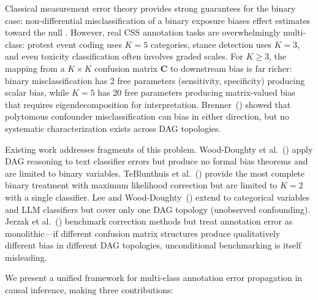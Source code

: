 \documentclass[11pt,letterpaper]{article}
\begin{document}
Classical measurement error theory provides strong guarantees for the binary case: non-differential misclassification of a binary exposure biases effect estimates toward the null \cite{bross1954}.
However, real CSS annotation tasks are overwhelmingly multi-class: protest event coding uses $K=5$ categories, stance detection uses $K=3$, and even toxicity classification often involves graded scales.
For $K \geq 3$, the mapping from a $K \times K$ confusion matrix $\mathbf{C}$ to downstream bias is far richer: binary misclassification has 2 free parameters (sensitivity, specificity) producing scalar bias, while $K=5$ has 20 free parameters producing matrix-valued bias that requires eigendecomposition for interpretation.
Brenner~(\citeyear{brenner1993}) showed that polytomous confounder misclassification can bias in either direction, but no systematic characterization exists across DAG topologies.

Existing work addresses fragments of this problem.
Wood-Doughty et al.~(\citeyear{wooddoughty2018}) apply DAG reasoning to text classifier errors but produce no formal bias theorems and are limited to binary variables.
TeBlunthuis et al.~(\citeyear{teblunthuis2024}) provide the most complete binary treatment with maximum likelihood correction but are limited to $K=2$ with a single classifier.
Lee and Wood-Doughty~(\citeyear{lee2024}) extend to categorical variables and LLM classifiers but cover only one DAG topology (unobserved confounding).
Jerzak et al.~(\citeyear{jerzak2025}) benchmark correction methods but treat annotation error as monolithic---if different confusion matrix structures produce qualitatively different bias in different DAG topologies, unconditional benchmarking is itself misleading.

We present a unified framework for multi-class annotation error propagation in causal inference, making three contributions:
\end{document}
